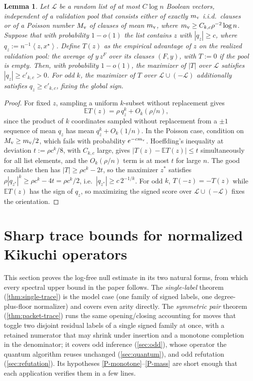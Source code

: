 \documentclass[11pt]{article}
\newtheorem{lemma}[lemma]{Lemma}
\theoremstyle{definition}
\theoremstyle{remark}
\newcommand{\E}{\mathbb E}
\newcommand{\1}{\mathbf 1}
\newcommand{\cL}{\mathcal L}
\newcommand{\xstar}{{x^\star}}
\newcommand{\ip}[2]{\left\langle #1,#2\right\rangle}
\numberwithin{equation}{section}
\begin{document}
\begin{lemma}\label{lem:validation}
Let $\cL$ be a random list of at most $C\log n$ Boolean vectors,
independent of a validation pool that consists either of exactly
$m_{\rm v}$ i.i.d.\ clauses or of a Poisson number $M_{\rm v}$ of clauses
of mean $m_{\rm v}$, where
$m_{\rm v}\ge C_{k,c}\rho^{-2}\log n$.  Suppose that with probability
$1-o(1)$ the list contains $z$ with $|q_z|\ge c$, where
$q_z:=n^{-1}\ip z{\xstar}$.  Define $T(z)$ as the empirical advantage
of $z$ on the realized validation pool: the average of $y\,z^{F}$ over
its clauses $(F,y)$, with $T:=0$ if the pool is empty.  Then,
with probability $1-o(1)$, the maximizer of $|T|$ over $\cL$ satisfies
$|q_z|\ge c'_{k,c}>0$.  For odd $k$, the maximizer of $T$ over
$\cL\cup(-\cL)$ additionally satisfies $q_z\ge c'_{k,c}$, fixing the
global sign.
\end{lemma}
\begin{proof}
For fixed $z$, sampling a uniform $k$-subset without replacement gives
\begin{equation}\label{eq:validation-mean}
 \E T(z)=\rho\,q_z^k+O_k(\rho/n),
\end{equation}
since the product of $k$ coordinates sampled without replacement from a
$\pm1$ sequence of mean $q_z$ has mean $q_z^k+O_k(1/n)$.  In the Poisson
case, condition on $M_{\rm v}\ge m_{\rm v}/2$, which fails with
probability $e^{-cm_{\rm v}}$.  Hoeffding's inequality at deviation
$t:=\rho c^k/8$, with $C_{k,c}$ large, gives $|T(z)-\E T(z)|\le t$
simultaneously for all list elements, and the $O_k(\rho/n)$ term is at
most $t$ for large $n$.  The good candidate then has
$|T|\ge\rho c^k-2t$, so the maximizer $z^*$ satisfies
$\rho|q_{z^*}|^k\ge\rho c^k-4t=\rho c^k/2$, i.e.\
$|q_{z^*}|\ge c\,2^{-1/k}$.  For odd $k$, $T(-z)=-T(z)$ while
$\E T(z)$ has the sign of $q_z$, so maximizing the signed score over
$\cL\cup(-\cL)$ fixes the orientation.
\end{proof}

\section{Sharp trace bounds for normalized Kikuchi operators}
\label{sec:trace}

This section proves the log-free null estimate in its two natural
forms, from which every spectral upper bound in the paper follows.  The
\emph{single-label} theorem (\cref{thm:single-trace}) is the model
case (one family of signed labels, one degree-plus-floor
normalizer) and covers even arity directly.  The \emph{symmetric
pair} theorem (\cref{thm:packet-trace}) runs the same opening/closing
accounting for moves that toggle two disjoint residual labels of a
single signed family at once, with a retained numerator that may shrink
under insertion and a monotone completion in the denominator; it covers
odd inference (\cref{sec:odd}), whose operator the quantum algorithm
reuses unchanged (\cref{sec:quantum}), and odd refutation
(\cref{sec:refutation}).  Its hypotheses
\ref{P-monotone}--\ref{P-mass} are short enough that each application
verifies them in a few lines.
\end{document}
